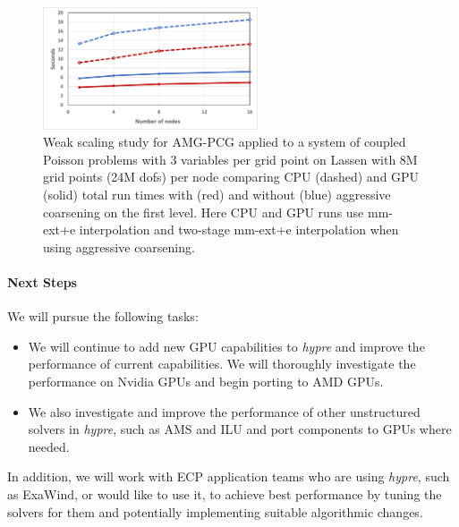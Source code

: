 \begin{figure}[bth]
\centering
	\includegraphics[width=2.5in]{projects/2.3.3-MathLibs/2.3.3.12-SUNDIALS-hypre/a1-sysLap.png}
	\caption{\label{fig:syslap} Weak scaling study for AMG-PCG applied to a system of coupled Poisson problems with 3 variables per grid point on Lassen with 8M grid points (24M dofs) per node comparing CPU (dashed) and GPU (solid) total run times with (red) and without (blue) aggressive coarsening on the first level. Here CPU and GPU runs use mm-ext+e interpolation and two-stage mm-ext+e interpolation when using aggressive coarsening.}
\end{figure}

\paragraph{Next Steps}

We will pursue the following tasks:

\begin{itemize}
\item We will continue to add new GPU capabilities to {\sl hypre} and improve the performance of current capabilities. We will thoroughly investigate the performance on Nvidia GPUs and begin porting to AMD GPUs.
\item We also investigate and improve the performance of other unstructured solvers in {\sl hypre}, such as AMS and ILU and port components to GPUs where needed.
\end{itemize}
In addition, we will work with ECP application teams who are using {\sl hypre}, such as ExaWind, or would like to use it, to achieve best performance by tuning the solvers for them and potentially implementing suitable algorithmic changes.
